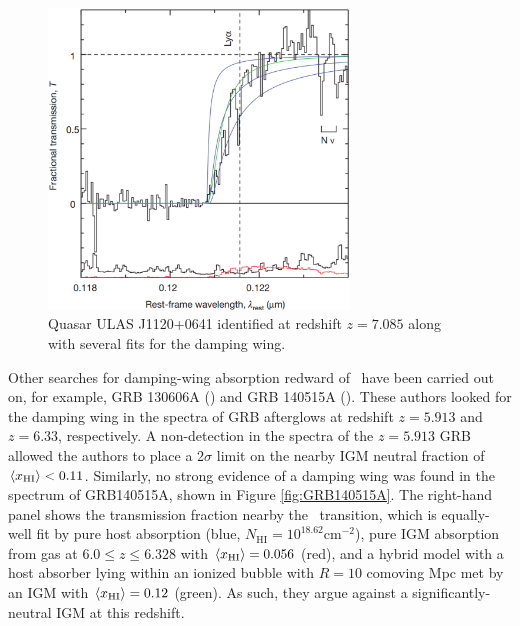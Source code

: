 \begin{figure}[!p]
  \centering
  \includegraphics[width=8cm]{z7p085_DampingWing.eps}
  \caption{Quasar ULAS J1120+0641 identified at redshift $z = 7.085$ along with several fits for the damping wing.}
  \label{fig:Mortlock}
\end{figure}


Other searches for damping-wing absorption redward of \lya\ have been carried out on, for example, GRB 130606A (\citealt{Chornock:2013una}) and GRB 140515A (\citealt{Chornock:2014fva}). These authors looked for the damping wing in the spectra of GRB afterglows at redshift $z = 5.913$ and $z = 6.33$, respectively. A non-detection in the spectra of the $z = 5.913$ GRB allowed the authors to place a $2\sigma$ limit on the nearby IGM neutral fraction of $\langle x_{\text{HI}}\rangle < 0.11$. Similarly, no strong evidence of a damping wing was found in the spectrum of GRB140515A, shown in Figure \ref{fig:GRB140515A}. The right-hand panel shows the transmission fraction nearby the \lya\ transition, which is equally-well fit by pure host absorption (blue, $N_{\text{HI}} = 10^{18.62}\text{cm}^{-2}$), pure IGM absorption from gas at $6.0 \leq z \leq 6.328$ with $\langle x_{\text{HI}}\rangle = 0.056$ (red), and a hybrid model with a host absorber lying within an ionized bubble with $R = 10$ comoving Mpc met by an IGM with $\langle x_{\text{HI}}\rangle = 0.12$ (green). As such, they argue against a significantly-neutral IGM at this redshift.  

